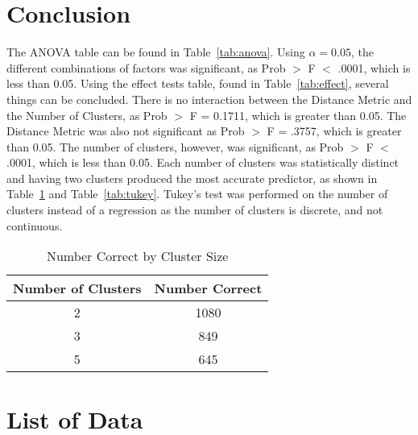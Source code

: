\documentclass[times]{article}
\begin{document}
   \section{Conclusion}

   The ANOVA table can be found in Table~\ref{tab:anova}.
   Using $\alpha = 0.05$, the different combinations of factors was significant, as
   Prob $>$ F $<$ .0001, which is less than 0.05.
   Using the effect tests table, found in Table~\ref{tab:effect}, several things can be concluded.
   There is no interaction between the Distance Metric and the Number
   of Clusters, as Prob $>$ F = 0.1711, which is greater than 0.05.
   The Distance Metric was also not significant as Prob $>$ F = .3757, which is greater than 0.05.
   The number of clusters, however, was significant, as Prob $>$ F $<$ .0001, which is less than 0.05.
   Each number of clusters was statistically distinct and having two clusters produced the most 
   accurate predictor, as shown in Table~\ref{tab:by_cluster} and Table~\ref{tab:tukey}.  
   Tukey's test was performed on the number of clusters instead of a regression as the number of
   clusters is discrete, and not continuous.
   
   \begin{table}[H]
      \centering
      \caption{Number Correct by Cluster Size}
      \label{tab:by_cluster}
      \begin{tabular}{| c | c |}
         \hline
         Number of Clusters & Number Correct \\
         \hline
         2 & 1080 \\
         \hline
         3 & 849 \\
         \hline
         5 & 645 \\
         \hline
      \end{tabular}
   \end{table}

   \appendix
   \section{List of Data}
\end{document}
